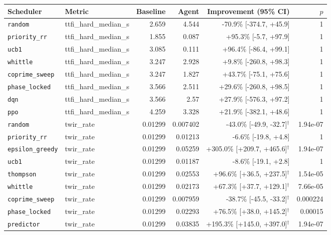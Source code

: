 \begin{table}[t]
  \centering
  \small
  \begin{tabular}{llrrrr}
    \toprule
    Scheduler & Metric & Baseline & Agent & Improvement (95\% CI) & $p$ \\
    \midrule
    \texttt{random} & ttfi\_hard\_median\_s & 2.659 & 4.544 & -70.9\% [-374.7, +45.9] & 1 \\
    \texttt{priority\_rr} & ttfi\_hard\_median\_s & 1.855 & 0.087 & +95.3\% [-5.7, +97.9] & 1 \\
    \texttt{ucb1} & ttfi\_hard\_median\_s & 3.085 & 0.111 & +96.4\% [-86.4, +99.1] & 1 \\
    \texttt{whittle} & ttfi\_hard\_median\_s & 3.247 & 2.928 & +9.8\% [-260.8, +98.3] & 1 \\
    \texttt{coprime\_sweep} & ttfi\_hard\_median\_s & 3.247 & 1.827 & +43.7\% [-75.1, +75.6] & 1 \\
    \texttt{phase\_locked} & ttfi\_hard\_median\_s & 3.566 & 2.511 & +29.6\% [-260.8, +98.5] & 1 \\
    \texttt{dqn} & ttfi\_hard\_median\_s & 3.566 & 2.57 & +27.9\% [-576.3, +97.2] & 1 \\
    \texttt{ppo} & ttfi\_hard\_median\_s & 4.259 & 3.328 & +21.9\% [-382.1, +48.6] & 1 \\
    \midrule
    \texttt{random} & twir\_rate & 0.01299 & 0.007402 & -43.0\% [-49.9, -32.7]$^{\dagger}$ & 1.94e-07 \\
    \texttt{priority\_rr} & twir\_rate & 0.01299 & 0.01213 & -6.6\% [-19.8, +4.8] & 1 \\
    \texttt{epsilon\_greedy} & twir\_rate & 0.01299 & 0.05259 & +305.0\% [+209.7, +465.6]$^{\dagger}$ & 1.94e-07 \\
    \texttt{ucb1} & twir\_rate & 0.01299 & 0.01187 & -8.6\% [-19.1, +2.8] & 1 \\
    \texttt{thompson} & twir\_rate & 0.01299 & 0.02553 & +96.6\% [+36.5, +237.5]$^{\dagger}$ & 1.54e-05 \\
    \texttt{whittle} & twir\_rate & 0.01299 & 0.02173 & +67.3\% [+37.7, +129.1]$^{\dagger}$ & 7.66e-05 \\
    \texttt{coprime\_sweep} & twir\_rate & 0.01299 & 0.007959 & -38.7\% [-45.5, -33.2]$^{\dagger}$ & 0.000224 \\
    \texttt{phase\_locked} & twir\_rate & 0.01299 & 0.02293 & +76.5\% [+38.0, +145.2]$^{\dagger}$ & 0.00015 \\
    \texttt{predictor} & twir\_rate & 0.01299 & 0.03835 & +195.3\% [+145.0, +397.0]$^{\dagger}$ & 1.94e-07 \\

\end{tabular}
\end{table}
